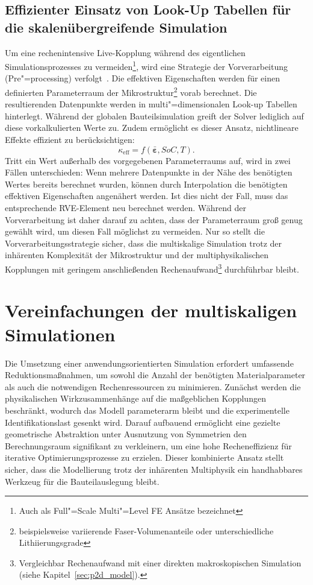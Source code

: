 \subsection{\label{sec:look_up_tables}Effizienter Einsatz von Look-Up Tabellen für die skalenübergreifende Simulation}

Um eine rechenintensive Live-Kopplung während des eigentlichen Simulationsprozesses zu vermeiden\footnote{Auch als Full"=Scale Multi"=Level FE Ansätze bezeichnet}, wird eine Strategie der Vorverarbeitung (Pre"=processing) verfolgt~\cite{ZohdiWriggers2005, Geers2008}. Die effektiven Eigenschaften werden für einen definierten Parameterraum der Mikrostruktur\footnote{beispielsweise variierende Faser-Volumenanteile oder unterschiedliche Lithiierungsgrade} vorab berechnet. Die resultierenden Datenpunkte werden in multi"=dimensionalen Look-up Tabellen hinterlegt. Während der globalen Bauteilsimulation greift der Solver lediglich auf diese vorkalkulierten Werte zu. Zudem ermöglicht es dieser Ansatz, nichtlineare Effekte effizient zu berücksichtigen:
\begin{equation}
    \kappa_{\text{eff}} = f(\bar{\boldsymbol{\varepsilon}}, SoC, T).
\end{equation}
Tritt ein Wert außerhalb des vorgegebenen Parameterraums auf, wird in zwei Fällen unterschieden: 
Wenn mehrere Datenpunkte in der Nähe des benötigten Wertes bereits berechnet wurden, können durch Interpolation die benötigten effektiven Eigenschaften angenähert werden. Ist dies nicht der Fall, muss das entsprechende RVE-Element neu berechnet werden. Während der Vorverarbeitung ist daher darauf zu achten, dass der Parameterraum groß genug gewählt wird, um diesen Fall möglichst zu vermeiden. Nur so stellt die Vorverarbeitungsstrategie sicher, dass die multiskalige Simulation trotz der inhärenten Komplexität der Mikrostruktur und der multiphysikalischen Kopplungen mit geringem anschließenden Rechenaufwand\footnote{Vergleichbar Rechenaufwand mit einer direkten makroskopischen Simulation (siehe Kapitel~\ref{sec:p2d_model}).} durchführbar bleibt.


\section{\label{sec:reduction_and_parallelization}Vereinfachungen der multiskaligen Simulationen}

Die Umsetzung einer anwendungsorientierten Simulation erfordert umfassende Reduktionsmaßnahmen, um sowohl die Anzahl der benötigten Materialparameter als auch die notwendigen Rechenressourcen zu minimieren. Zunächst werden die physikalischen Wirkzusammenhänge auf die maßgeblichen Kopplungen beschränkt, wodurch das Modell parameterarm bleibt und die experimentelle Identifikationslast gesenkt wird. Darauf aufbauend ermöglicht eine gezielte geometrische Abstraktion unter Ausnutzung von Symmetrien den Berechnungsraum signifikant zu verkleinern, um eine hohe Recheneffizienz für iterative Optimierungsprozesse zu erzielen. Dieser kombinierte Ansatz stellt sicher, dass die Modellierung trotz der inhärenten Multiphysik ein handhabbares Werkzeug für die Bauteilauslegung bleibt.

